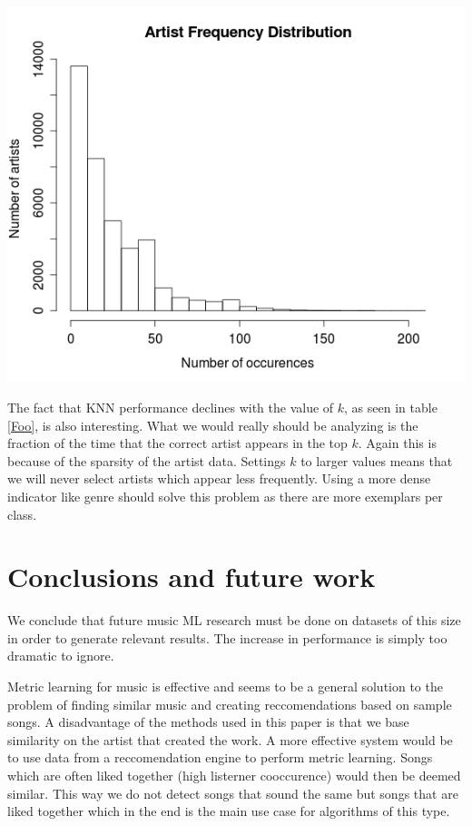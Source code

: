 \documentclass[a4paper,10pt]{article}
\begin{document}
\begin{center}
 \includegraphics[scale=0.4,keepaspectratio=true]{./artist_frequency_dist.png}
\end{center}

The fact that KNN performance declines with the value of $k$, as seen in table \ref{Foo}, is also interesting. What we would really should be analyzing is the fraction of the time that the correct artist appears in the top $k$. Again this is because of the sparsity of the artist data. Settings $k$ to larger values means that we will never select artists which appear less frequently. Using a more dense indicator like genre should solve this problem as there are more exemplars per class.

\section{Conclusions and future work}
We conclude that future music ML research must be done on datasets of this size in order to generate relevant results. The increase in performance is simply too dramatic to ignore.

Metric learning for music is effective and seems to be a general solution to the problem of finding similar music and creating reccomendations based on sample songs. A disadvantage of the methods used in this paper is that we base similarity on the artist that created the work. A more effective system would be to use data from a reccomendation engine to perform metric learning. Songs which are often liked together (high listerner cooccurence) would then be deemed similar. This way we do not detect songs that sound the same but songs that are liked together which in the end is the main use case for algorithms of this type. 
{}
\end{document}
